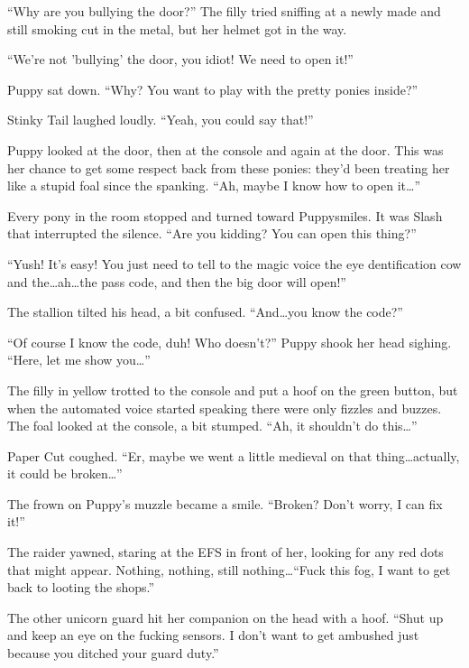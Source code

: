``Why are you bullying the door?'' The filly tried sniffing at a newly made and still smoking cut in the metal, but her helmet got in the way.

``We're not 'bullying' the door, you idiot! We need to open it!''

Puppy sat down. ``Why? You want to play with the pretty ponies inside?''

Stinky Tail laughed loudly. ``Yeah, you could say that!''

Puppy looked at the door, then at the console and again at the door. This was her chance to get some respect back from these ponies: they'd been treating her like a stupid foal since the spanking. ``Ah, maybe I know how to open it\dots''

Every pony in the room stopped and turned toward Puppysmiles. It was Slash that interrupted the silence. ``Are you kidding? You can open this thing?''

``Yush! It's easy! You just need to tell to the magic voice the eye dentification cow and the\dots ah\dots the pass code, and then the big door will open!''

The stallion tilted his head, a bit confused. ``And\dots you know the code?''

``Of course I know the code, duh! Who doesn't?'' Puppy shook her head sighing. ``Here, let me show you\dots''

The filly in yellow trotted to the console and put a hoof on the green button, but when the automated voice started speaking there were only fizzles and buzzes. The foal looked at the console, a bit stumped. ``Ah, it shouldn't do this\dots''

Paper Cut coughed. ``Er, maybe we went a little medieval on that thing\dots actually, it could be broken\dots''

The frown on Puppy's muzzle became a smile. ``Broken? Don't worry, I can fix it!''

\horizonline


The raider yawned, staring at the EFS in front of her, looking for any red dots that might appear. Nothing, nothing, still nothing\dots ``Fuck this fog, I want to get back to looting the shops.''

The other unicorn guard hit her companion on the head with a hoof. ``Shut up and keep an eye on the fucking sensors. I don't want to get ambushed just because you ditched your guard duty.''

